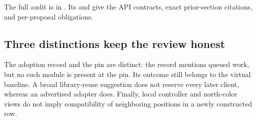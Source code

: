 The full audit is in . Its  and  give the API contracts, exact prior-section citations, and per-proposal obligations.

\subsection{Three distinctions keep the review honest}

The adoption record and the pin are distinct: the record mentions queued  work, but no such module is present at the pin. Its outcome still belongs to the virtual baseline. A broad library-reuse suggestion does not reserve every later client, whereas an advertised adapter does. Finally, local controller and north-color views do not imply compatibility of neighboring positions in a newly constructed row.
